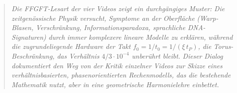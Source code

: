 \begin{quote}
\itshape
Die FFGFT-Lesart der vier Videos zeigt ein durchg\"angiges Muster: Die zeitgen\"ossische Physik versucht, Symptome an der Oberfl\"ache (Warp-Blasen, Verschr\"ankung, Informationsparadoxa, sprachliche DNA-Signaturen) durch immer komplexere lineare Modelle zu erkl\"aren, w\"ahrend die zugrundeliegende Hardware \textendash{} der Takt $f_0 = 1/t_0 = 1/(\xi\,t_P)$, die Torus-Beschr\"ankung, das Verh\"altnis $4/3 \cdot 10^{-4}$ \textendash{} unber\"uhrt bleibt. Dieser Dialog dokumentiert den Weg von der Kritik einzelner Videos zur Skizze eines verh\"altnisbasierten, phasenorientierten Rechenmodells, das die bestehende Mathematik nutzt, aber in eine geometrische Harmonielehre einbettet.
\end{quote}

